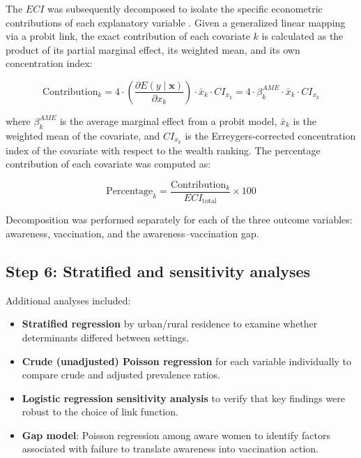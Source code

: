 The $ECI$ was subsequently decomposed to isolate the specific econometric contributions of each explanatory variable \cite{erreygers2009}. Given a generalized linear mapping via a probit link, the exact contribution of each covariate $k$ is calculated as the product of its partial marginal effect, its weighted mean, and its own concentration index:

\begin{equation}
\text{Contribution}_k = 4 \cdot \left( \frac{\partial E(y \mid \mathbf{x})}{\partial x_k} \right) \cdot \bar{x}_k \cdot CI_{x_k} = 4 \cdot \beta_k^{AME} \cdot \bar{x}_k \cdot CI_{x_k}
\label{eq:erreygers_contrib}
\end{equation}

\noindent where $\beta_k^{AME}$ is the average marginal effect from a probit model, $\bar{x}_k$ is the weighted mean of the covariate, and $CI_{x_k}$ is the Erreygers-corrected concentration index of the covariate with respect to the wealth ranking. The percentage contribution of each covariate was computed as:

\begin{equation}
\text{Percentage}_k = \frac{\text{Contribution}_k}{ECI_{\text{total}}} \times 100
\label{eq:pct_contrib}
\end{equation}

Decomposition was performed separately for each of the three outcome variables: awareness, vaccination, and the awareness--vaccination gap.

\subsection{Step 6: Stratified and sensitivity analyses}

Additional analyses included:
\begin{itemize}
	\item \textbf{Stratified regression} by urban/rural residence to examine whether determinants differed between settings.
	\item \textbf{Crude (unadjusted) Poisson regression} for each variable individually to compare crude and adjusted prevalence ratios.
	\item \textbf{Logistic regression sensitivity analysis} to verify that key findings were robust to the choice of link function.
	\item \textbf{Gap model}: Poisson regression among aware women to identify factors associated with failure to translate awareness into vaccination action.
\end{itemize}

